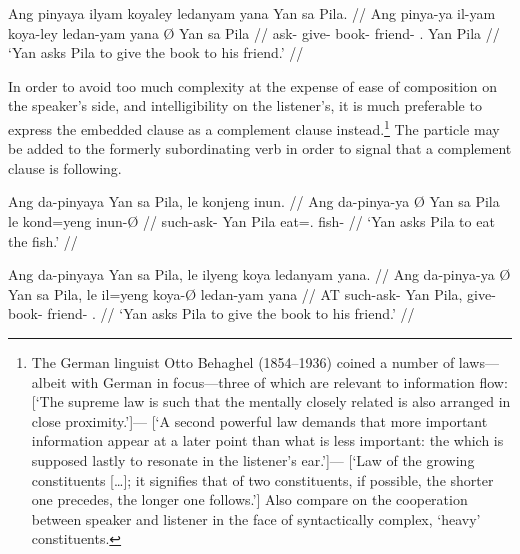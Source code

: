 \a\ljudge{\ques\ques}\begingl
	\gla Ang pinyaya \normalfont{[}ilyam koyaley ledanyam 
		yana\normalfont{]} {} Yan sa Pila. //
	\glb Ang pinya-ya il-yam koya-ley ledan-yam yana Ø Yan sa Pila //
	\glc \AgtT{} ask-\TsgM{} give-\Ptcp{} book-\PargI{} friend-\Dat{} 
		\TsgM{}.\Gen{} \Top{} Yan \Parg{} Pila //
	\glft `Yan asks Pila to give the book to his friend.' //
\endgl
\xe

In order to avoid too much complexity at the expense of ease of composition on
the speaker's side, and intelligibility on the listener's, it is much
preferable to express the embedded clause as a complement clause
instead.\footnote{The German linguist Otto Behaghel (1854--1936) coined a
number of laws---albeit with German in focus---three of which are relevant to
information flow:  [`The
supreme law is such that the mentally closely related is also arranged in close
proximity.']--- [`A second powerful law demands that more
important information appear at a later point than what is less important: the
which is supposed lastly to resonate in the listener's
ear.']--- [`Law of the growing constituents […]; it signifies that of
two constituents, if possible, the shorter one precedes, the longer one
follows.'] Also compare \citet{wasow1997} on the cooperation between speaker
and listener in the face of syntactically complex, `heavy' constituents.} The
particle  may be added to the formerly subordinating verb in
order to signal that a complement clause is following.

\pex
\a\begingl
	\gla Ang da-pinyaya {} Yan sa Pila, \normalfont{[}le konjeng 
		inun\normalfont{]}. //
	\glb Ang da-pinya-ya Ø Yan sa Pila le kond=yeng inun-Ø //
	\glc \AgtT{} such-ask-\TsgM{} \Top{} Yan \Parg{} Pila \PatTI{} 
		eat=\TsgF{}.\Aarg{} fish-\Top{} //
	\glft `Yan asks Pila to eat the fish.' //
\endgl

\a\begingl
	\gla Ang da-pinyaya {} Yan sa Pila, \normalfont{[}le ilyeng koya 
		ledanyam yana\normalfont{]}. //
	\glb Ang da-pinya-ya Ø Yan sa Pila, le il=yeng koya-Ø ledan-yam
		yana //
	\glc AT such-ask-\TsgM{} \Top{} Yan \Parg{} Pila, \PatTI{} give-\TsgF{} 
		book-\Top{} friend-\Dat{} \TsgM{}.\Gen{} //
	\glft `Yan asks Pila to give the book to his friend.' //
\endgl
\xe

